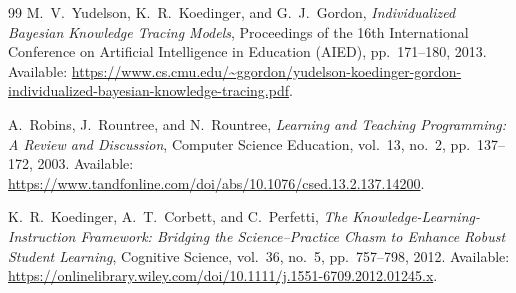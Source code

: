 \documentclass{article}
\begin{document}
\begin{thebibliography}{99}
M.~V.~Yudelson, K.~R.~Koedinger, and G.~J.~Gordon,
\textit{Individualized Bayesian Knowledge Tracing Models},
Proceedings of the 16th International Conference on Artificial Intelligence in Education (AIED), pp.~171--180, 2013.
Available: \url{https://www.cs.cmu.edu/~ggordon/yudelson-koedinger-gordon-individualized-bayesian-knowledge-tracing.pdf}.

A.~Robins, J.~Rountree, and N.~Rountree,
\textit{Learning and Teaching Programming: A Review and Discussion},
Computer Science Education, vol.~13, no.~2, pp.~137--172, 2003.
Available: \url{https://www.tandfonline.com/doi/abs/10.1076/csed.13.2.137.14200}.

K.~R.~Koedinger, A.~T.~Corbett, and C.~Perfetti,
\textit{The Knowledge-Learning-Instruction Framework: Bridging the Science--Practice Chasm to Enhance Robust Student Learning},
Cognitive Science, vol.~36, no.~5, pp.~757--798, 2012.
Available: \url{https://onlinelibrary.wiley.com/doi/10.1111/j.1551-6709.2012.01245.x}.

\end{thebibliography}
\end{document}
